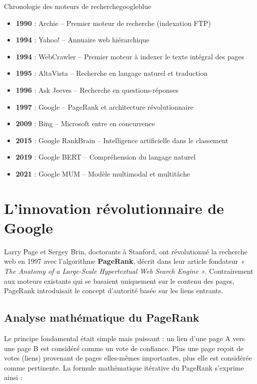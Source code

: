 \documentclass[12pt,a4paper,twoside]{report}
\newcommand{\keyword}[1]{\textbf{\textcolor{googleblue}{#1}}}
\begin{document}
\begin{mybox}{Chronologie des moteurs de recherche}{googleblue}
\begin{itemize}
    \item \textbf{1990} : Archie -- Premier moteur de recherche (indexation FTP)
    \item \textbf{1994} : Yahoo! -- Annuaire web hiérarchique
    \item \textbf{1994} : WebCrawler -- Premier moteur à indexer le texte intégral des pages
    \item \textbf{1995} : AltaVista -- Recherche en langage naturel et traduction
    \item \textbf{1996} : Ask Jeeves -- Recherche en questions-réponses
    \item \textbf{1997} : Google -- PageRank et architecture révolutionnaire
    \item \textbf{2009} : Bing -- Microsoft entre en concurrence
    \item \textbf{2015} : Google RankBrain -- Intelligence artificielle dans le classement
    \item \textbf{2019} : Google BERT -- Compréhension du langage naturel
    \item \textbf{2021} : Google MUM -- Modèle multimodal et multitâche
\end{itemize}
\end{mybox}

\section{L'innovation révolutionnaire de Google}

Larry Page et Sergey Brin, doctorants à Stanford, ont révolutionné la recherche web en 1997 avec l'algorithme \keyword{PageRank}, décrit dans leur article fondateur \textit{« The Anatomy of a Large-Scale Hypertextual Web Search Engine »}. Contrairement aux moteurs existants qui se basaient uniquement sur le contenu des pages, PageRank introduisait le concept d'autorité basée sur les liens entrants.

\subsection{Analyse mathématique du PageRank}

Le principe fondamental était simple mais puissant : un lien d'une page A vers une page B est considéré comme un vote de confiance. Plus une page reçoit de votes (liens) provenant de pages elles-mêmes importantes, plus elle est considérée comme pertinente. La formule mathématique itérative du PageRank s'exprime ainsi :
\end{document}
